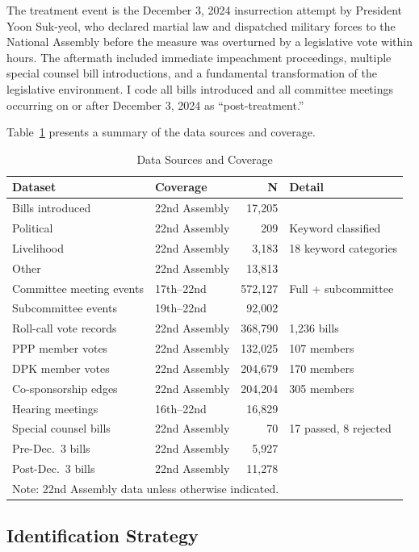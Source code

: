 \documentclass[11pt]{article}
\begin{document}
The treatment event is the December 3, 2024 insurrection attempt by President Yoon Suk-yeol, who declared martial law and dispatched military forces to the National Assembly before the measure was overturned by a legislative vote within hours. The aftermath included immediate impeachment proceedings, multiple special counsel bill introductions, and a fundamental transformation of the legislative environment. I code all bills introduced and all committee meetings occurring on or after December 3, 2024 as ``post-treatment.''

Table~\ref{tab:desc} presents a summary of the data sources and coverage.

\begin{table}[htbp]
\centering
\caption{Data Sources and Coverage}
\label{tab:desc}
\begin{tabular}{llrl}
\toprule
Dataset & Coverage & N & Detail \\
\midrule
Bills introduced & 22nd Assembly & 17,205 & \\
\quad Political & 22nd Assembly & 209 & Keyword classified \\
\quad Livelihood & 22nd Assembly & 3,183 & 18 keyword categories \\
\quad Other & 22nd Assembly & 13,813 & \\
Committee meeting events & 17th--22nd & 572,127 & Full + subcommittee \\
\quad Subcommittee events & 19th--22nd & 92,002 & \\
Roll-call vote records & 22nd Assembly & 368,790 & 1,236 bills \\
\quad PPP member votes & 22nd Assembly & 132,025 & 107 members \\
\quad DPK member votes & 22nd Assembly & 204,679 & 170 members \\
Co-sponsorship edges & 22nd Assembly & 204,204 & 305 members \\
Hearing meetings & 16th--22nd & 16,829 & \\
Special counsel bills & 22nd Assembly & 70 & 17 passed, 8 rejected \\
\midrule
Pre-Dec.\ 3 bills & 22nd Assembly & 5,927 & \\
Post-Dec.\ 3 bills & 22nd Assembly & 11,278 & \\
\bottomrule
\multicolumn{4}{l}{\footnotesize Note: 22nd Assembly data unless otherwise indicated.}
\end{tabular}
\end{table}

\subsection{Identification Strategy}
\end{document}
